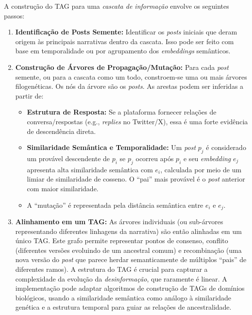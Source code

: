 \documentclass[12pt]{article}
\begin{document}
A construção do TAG para uma \textit{cascata de informação} envolve os seguintes passos:
\begin{enumerate}
    \item \textbf{Identificação de Posts Semente:} Identificar os \textit{posts} iniciais que deram origem às principais narrativas dentro da cascata. Isso pode ser feito com base em temporalidade ou por agrupamento dos \textit{embeddings} semânticos.
    \item \textbf{Construção de Árvores de Propagação/Mutação:} Para cada \textit{post} semente, ou para a cascata como um todo, constroem-se uma ou mais árvores filogenéticas. Os nós da árvore são os \textit{posts}. As arestas podem ser inferidas a partir de:
    \begin{itemize}
        \item \textbf{Estrutura de Resposta:} Se a plataforma fornecer relações de conversa/respostas (e.g., \textit{replies} no Twitter/X), essa é uma forte evidência de descendência direta.
        \item \textbf{Similaridade Semântica e Temporalidade:} Um \textit{post} $p_j$ é considerado um provável descendente de $p_i$ se $p_j$ ocorreu após $p_i$ e seu \textit{embedding} $e_j$ apresenta alta similaridade semântica com $e_i$, calculada por meio de um limiar de similaridade de cosseno. O ``pai'' mais provável é o \textit{post} anterior com maior similaridade.
        \item A ``mutação'' é representada pela distância semântica entre $e_i$ e $e_j$.
    \end{itemize}
    \item \textbf{Alinhamento em um TAG:} As árvores individuais (ou sub-árvores representando diferentes linhagens da narrativa) são então alinhadas em um único TAG. Este grafo permite representar pontos de consenso, conflito (diferentes versões evoluindo de um ancestral comum) e recombinação (uma nova versão do \textit{post} que parece herdar semanticamente de múltiplos ``pais'' de diferentes ramos). A estrutura do TAG é crucial para capturar a complexidade da evolução da \textit{desinformação}, que raramente é linear. A implementação pode adaptar algoritmos de construção de TAGs de domínios biológicos, usando a similaridade semântica como análogo à similaridade genética e a estrutura temporal para guiar as relações de ancestralidade.
\end{enumerate}
\end{document}
